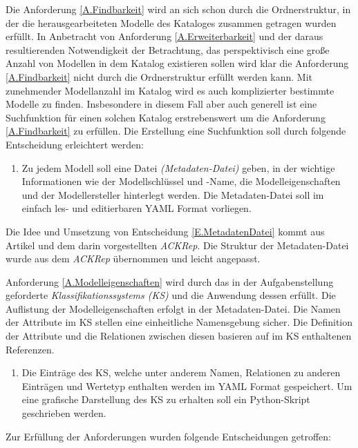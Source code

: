 Die Anforderung \ref{A.Findbarkeit} wird an sich schon durch die Ordnerstruktur, in der die herausgearbeiteten Modelle des Kataloges zusammen getragen wurden erfüllt. In Anbetracht von Anforderung \ref{A.Erweiterbarkeit} und der daraus resultierenden Notwendigkeit der Betrachtung, das perspektivisch eine große Anzahl von Modellen in dem Katalog existieren sollen wird klar die Anforderung \ref{A.Findbarkeit} nicht durch die Ordnerstruktur erfüllt werden kann. Mit zunehmender Modellanzahl im Katalog wird es auch komplizierter bestimmte Modelle zu finden. Insbesondere in diesem Fall aber auch generell ist eine Suchfunktion für einen solchen Katalog erstrebenswert um die Anforderung \ref{A.Findbarkeit} zu erfüllen. Die Erstellung eine Suchfunktion soll durch folgende Entscheidung erleichtert werden:\\
\begin{enumerate}[label=\textbf{Entscheidung E.\arabic*}:, ref=\textbf{E.\arabic*}, wide=0pt, leftmargin=*]
	\item \label{E.MetadatenDatei}Zu jedem Modell soll eine Datei \textit{(Metadaten-Datei)} geben, in der wichtige Informationen wie der Modellschlüssel und -Name, die Modelleigenschaften und der Modellersteller hinterlegt werden. Die Metadaten-Datei soll im einfach les- und editierbaren YAML Format vorliegen.
\end{enumerate}
Die Idee und Umsetzung von Entscheidung \ref{E.MetadatenDatei} kommt aus Artikel \cite{KNHE20a} und dem darin vorgestellten \textit{ACKRep}. Die Struktur der Metadaten-Datei wurde aus dem \textit{ACKRep} übernommen und leicht angepasst.

Anforderung \ref{A.Modelleigenschaften} wird durch das in der Aufgabenstellung geforderte \textit{Klassifikationssystems (KS)} und die Anwendung dessen erfüllt. Die Auflistung der Modelleigenschaften erfolgt in der Metadaten-Datei. Die Namen der Attribute im KS stellen eine einheitliche Namensgebung sicher. Die Definition der Attribute und die Relationen zwischen diesen basieren auf im KS enthaltenen Referenzen.\\
\begin{enumerate}[resume*]
	\item Die Einträge des KS, welche unter anderem Namen, Relationen zu anderen Einträgen und Wertetyp enthalten werden im YAML Format gespeichert. Um eine grafische Darstellung des KS zu erhalten soll ein Python-Skript geschrieben werden. 
\end{enumerate}


Zur Erfüllung der Anforderungen wurden folgende Entscheidungen getroffen:\\

